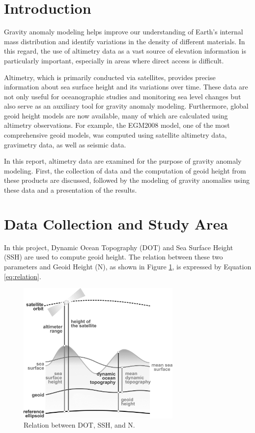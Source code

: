 \documentclass[12pt]{article}
\begin{document}
	
	\section{Introduction}
	
	Gravity anomaly modeling helps improve our understanding of Earth’s internal mass distribution and identify variations in the density of different materials. In this regard, the use of altimetry data as a vast source of elevation information is particularly important, especially in areas where direct access is difficult.
	
	Altimetry, which is primarily conducted via satellites, provides precise information about sea surface height and its variations over time. These data are not only useful for oceanographic studies and monitoring sea level changes but also serve as an auxiliary tool for gravity anomaly modeling. Furthermore, global geoid height models are now available, many of which are calculated using altimetry observations. For example, the EGM2008 model, one of the most comprehensive geoid models, was computed using satellite altimetry data, gravimetry data, as well as seismic data.
	
	In this report, altimetry data are examined for the purpose of gravity anomaly modeling. First, the collection of data and the computation of geoid height from these products are discussed, followed by the modeling of gravity anomalies using these data and a presentation of the results.
	
	\section{Data Collection and Study Area}
	
	In this project, Dynamic Ocean Topography (DOT) and Sea Surface Height (SSH) are used to compute geoid height. The relation between these two parameters and Geoid Height (N), as shown in Figure \ref{fig:relation}, is expressed by Equation \ref{eq:relation}.
	
	\begin{figure}[h!]
		\centering
		\includegraphics[height=7cm]{../Plots/dot_ggos.png}
		\caption{Relation between DOT, SSH, and N.}
		\label{fig:relation}
	\end{figure}
	
\end{document}

